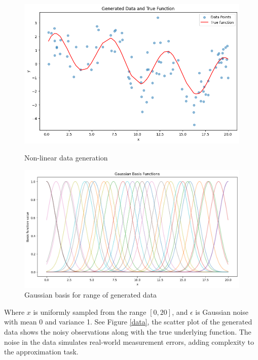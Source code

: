 \documentclass{article}
\begin{document}
\begin{figure}[h]
    \centering
    \begin{minipage}{0.45\textwidth}
        \centering
        \includegraphics[width=\textwidth]{figures/data.png} 
        \caption{Non-linear data generation}
        \label{data}
    \end{minipage}\hfill
    \begin{minipage}{0.55\textwidth}
        \centering
        \includegraphics[width=\textwidth]{figures/gaussian_basis.png} 
        \caption{Gaussian basis for range of generated data}
        \label{gaussian}
    \end{minipage}
\end{figure}
Where $x$ is uniformly sampled from the range $[0, 20]$, and $\epsilon$ is Gaussian noise with mean 0 and variance 1. See Figure \ref{data}, the scatter plot of the generated data shows the noisy observations along with the true underlying function. The noise in the data simulates real-world measurement errors, adding complexity to the approximation task.
\end{document}
